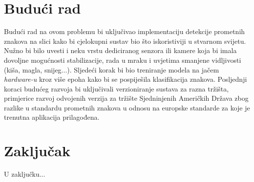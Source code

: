 \documentclass[times, utf8, zavrsni]{fer}
\begin{document}
\chapter{Budući rad}
Budući rad na ovom problemu bi uključivao implementaciju detekcije prometnih znakova na slici kako bi cjelokupni sustav bio što iskoristiviji u stvarnom svijetu. Nužno bi bilo uvesti i neku vrstu dediciranog senzora ili kamere koja bi imala dovoljne mogućnosti stabilizacije, 
rada u mraku i uvjetima smanjene vidljivosti (kiša, magla, snijeg...). Sljedeći korak bi bio treniranje modela na jačem \emph{hardware-u} kroz više epoha kako bi se pospiješila klasifikacija znakova. Posljednji koraci budućeg razvoja bi uključivali verzioniranje sustava za razna tržišta, primjerice
razvoj odvojenih verzija za tržište Sjedninjenih Američkih Država zbog razlike u standardu prometnih znakova u odnosu na europske standarde za koje je trenutna aplikacija prilagođena.

\chapter{Zaključak}
U zaključku...
\end{document}
